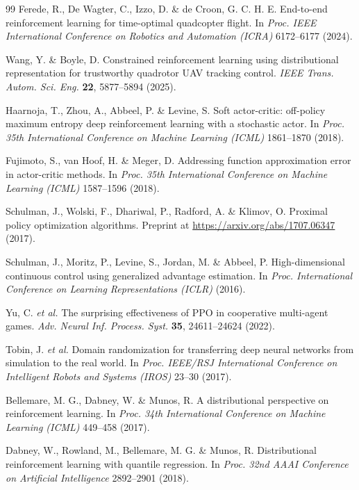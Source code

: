 \begin{thebibliography}{99}
 Ferede, R., De Wagter, C., Izzo, D. \& de Croon, G. C. H. E. End-to-end reinforcement learning for time-optimal quadcopter flight. In \textit{Proc. IEEE International Conference on Robotics and Automation (ICRA)} 6172--6177 (2024).

 Wang, Y. \& Boyle, D. Constrained reinforcement learning using distributional representation for trustworthy quadrotor UAV tracking control. \textit{IEEE Trans. Autom. Sci. Eng.} \textbf{22}, 5877--5894 (2025).

 Haarnoja, T., Zhou, A., Abbeel, P. \& Levine, S. Soft actor-critic: off-policy maximum entropy deep reinforcement learning with a stochastic actor. In \textit{Proc. 35th International Conference on Machine Learning (ICML)} 1861--1870 (2018).

 Fujimoto, S., van Hoof, H. \& Meger, D. Addressing function approximation error in actor-critic methods. In \textit{Proc. 35th International Conference on Machine Learning (ICML)} 1587--1596 (2018).

 Schulman, J., Wolski, F., Dhariwal, P., Radford, A. \& Klimov, O. Proximal policy optimization algorithms. Preprint at \url{https://arxiv.org/abs/1707.06347} (2017).

 Schulman, J., Moritz, P., Levine, S., Jordan, M. \& Abbeel, P. High-dimensional continuous control using generalized advantage estimation. In \textit{Proc. International Conference on Learning Representations (ICLR)} (2016).

 Yu, C. \textit{et al.} The surprising effectiveness of PPO in cooperative multi-agent games. \textit{Adv. Neural Inf. Process. Syst.} \textbf{35}, 24611--24624 (2022).

 Tobin, J. \textit{et al.} Domain randomization for transferring deep neural networks from simulation to the real world. In \textit{Proc. IEEE/RSJ International Conference on Intelligent Robots and Systems (IROS)} 23--30 (2017).

 Bellemare, M. G., Dabney, W. \& Munos, R. A distributional perspective on reinforcement learning. In \textit{Proc. 34th International Conference on Machine Learning (ICML)} 449--458 (2017).

 Dabney, W., Rowland, M., Bellemare, M. G. \& Munos, R. Distributional reinforcement learning with quantile regression. In \textit{Proc. 32nd AAAI Conference on Artificial Intelligence} 2892--2901 (2018).


\end{thebibliography}

